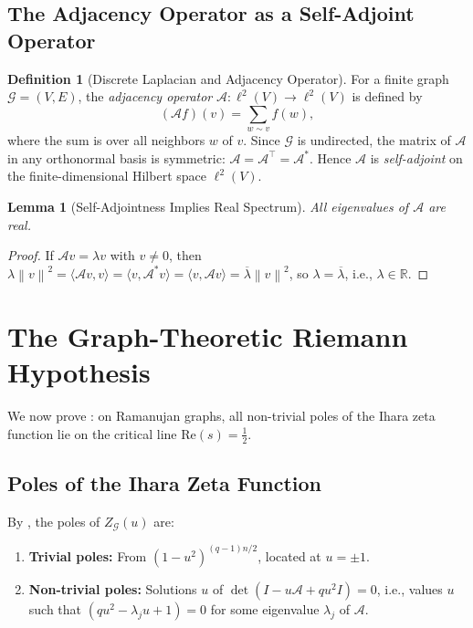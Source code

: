 \documentclass[12pt, a4paper]{article}
\theoremstyle{plain}
\newtheorem{lemma}[theorem]{Lemma}
\theoremstyle{definition}
\newtheorem{definition}[theorem]{Definition}
\theoremstyle{remark}
\newcommand{\R}{\mathbb{R}}
\newcommand{\norm}[1]{\left\| #1 \right\|}
\newcommand{\inner}[2]{\langle #1, #2 \rangle}
\newcommand{\calG}{\mathcal{G}}
\newcommand{\calA}{\mathcal{A}}
\newcommand{\re}{\mathrm{Re}}
\begin{document}
\subsection{The Adjacency Operator as a Self-Adjoint Operator}

\begin{definition}[Discrete Laplacian and Adjacency Operator]\label{def:adj}
  For a finite graph $\calG = (V, E)$, the \emph{adjacency operator}
  $\calA: \ell^2(V) \to \ell^2(V)$ is defined by
  \begin{equation}
    (\calA f)(v) = \sum_{w \sim v} f(w),
  \end{equation}
  where the sum is over all neighbors $w$ of $v$. Since $\calG$ is undirected,
  the matrix of $\calA$ in any orthonormal basis is symmetric:
  $\calA = \calA^\top = \calA^*$. Hence $\calA$ is \emph{self-adjoint} on the
  finite-dimensional Hilbert space $\ell^2(V)$.
\end{definition}

\begin{lemma}[Self-Adjointness Implies Real Spectrum]\label{lem:real}
  All eigenvalues of $\calA$ are real.
\end{lemma}

\begin{proof}
  If $\calA v = \lambda v$ with $v \neq 0$, then
  $\lambda \norm{v}^2 = \inner{\calA v}{v} = \inner{v}{\calA^* v}
  = \inner{v}{\calA v} = \overline{\lambda} \norm{v}^2$,
  so $\lambda = \overline{\lambda}$, i.e., $\lambda \in \R$.
\end{proof}

\section{The Graph-Theoretic Riemann Hypothesis}\label{sec:graph_rh}

We now prove : on Ramanujan graphs, all non-trivial poles
of the Ihara zeta function lie on the critical line $\re(s) = \frac{1}{2}$.

\subsection{Poles of the Ihara Zeta Function}

By , the poles of $Z_\calG(u)$ are:
\begin{enumerate}[label=(\roman*)]
  \item \textbf{Trivial poles:} From $(1-u^2)^{(q-1)n/2}$, located at $u = \pm 1$.
  \item \textbf{Non-trivial poles:} Solutions $u$ of
    $\det(I - u\calA + qu^2 I) = 0$, i.e., values $u$ such that
    $(qu^2 - \lambda_j u + 1) = 0$ for some eigenvalue $\lambda_j$ of $\calA$.
\end{enumerate}
\end{document}
